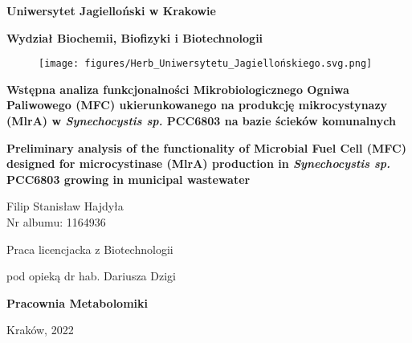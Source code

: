 \begin{titlepage}
    \thispagestyle{empty}
    \begin{center}
    
        \textbf{\large Uniwersytet Jagielloński w Krakowie}
        
        \vspace{0.5cm}
        
        \textbf{\Large Wydział Biochemii, Biofizyki i Biotechnologii}
        
        \vspace{0.5cm}
        
        \begin{figure}[h]
            \centering
            \texttt{[image: figures/Herb\_Uniwersytetu\_Jagiellońskiego.svg.png]}
            \label{fig:title}
        \end{figure}
        
        \vspace{0.5cm}

        \textbf{\Large Wstępna analiza funkcjonalności Mikrobiologicznego Ogniwa Paliwowego (MFC) ukierunkowanego na produkcję mikrocystynazy (MlrA) w \textit{Synechocystis sp.} PCC6803 na bazie ścieków komunalnych}

        \vspace{\fill}

        \textbf{\Large Preliminary analysis of the functionality of Microbial Fuel Cell (MFC) designed for microcystinase (MlrA) production in \textit{Synechocystis sp.} PCC6803 growing in municipal wastewater}

        \vspace{1.5cm}

        {\large Filip Stanisław Hajdyła}\\
        Nr albumu: 1164936

        \vspace{1.5cm}
        
        {\large Praca licencjacka z Biotechnologii}
        
        \vspace{0.3cm}
        
        {\large pod opieką dr hab. Dariusza Dzigi}
        
        \vspace{1cm}
        
        \textbf{\Large Pracownia Metabolomiki}
        
        \vspace{1cm}
        
        Kraków, 2022
        
    \end{center}
\end{titlepage}